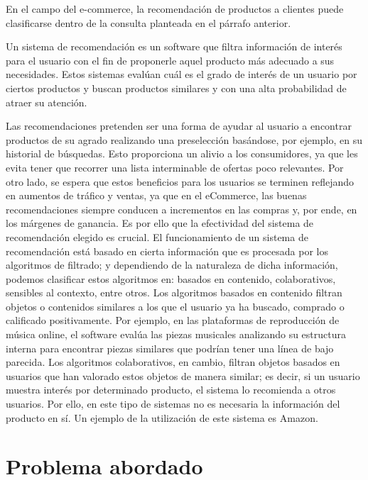En el campo del e-commerce, la recomendaci\'on de productos a clientes puede clasificarse dentro de la consulta planteada en el p\'arrafo anterior.

Un sistema de recomendaci\'on es un software que filtra informaci\'on de inter\'es para el usuario con el fin de proponerle aquel producto m\'as adecuado a sus necesidades. Estos sistemas eval\'uan cu\'al es el grado de inter\'es de un usuario por ciertos productos y buscan productos similares y con una alta probabilidad de atraer su atenci\'on.

Las recomendaciones pretenden ser una forma de ayudar al usuario a encontrar productos de su agrado realizando una preselecci\'on bas\'andose, por ejemplo, en su historial de b\'usquedas. Esto proporciona un alivio a los consumidores, ya que les evita tener que recorrer una lista interminable de ofertas poco relevantes. Por otro lado, se espera que estos beneficios para los usuarios se terminen reflejando en aumentos de tr\'afico y ventas, ya que en el eCommerce, las buenas recomendaciones siempre conducen a incrementos en las compras y, por ende, en los m\'argenes de ganancia. Es por ello que la efectividad del sistema de recomendaci\'on elegido es crucial.
El funcionamiento de un sistema de recomendaci\'on est\'a basado en cierta informaci\'on que es procesada por los algoritmos de filtrado; y dependiendo de la naturaleza de dicha informaci\'on, podemos clasificar estos algoritmos en: basados en contenido, colaborativos, sensibles al contexto, entre otros.
Los algoritmos basados en contenido filtran objetos o contenidos similares a los que el usuario ya ha buscado, comprado o calificado positivamente. Por ejemplo, en las plataformas de reproducci\'on de m\'usica online, el software eval\'ua las piezas musicales analizando su estructura interna para encontrar piezas similares que podr\'ian tener una l\'inea de bajo parecida.
Los algoritmos colaborativos, en cambio, filtran objetos basados en usuarios que han valorado estos objetos de manera similar; es decir, si un usuario muestra inter\'es por determinado producto, el sistema lo recomienda a otros usuarios. Por ello, en este tipo de sistemas no es necesaria la informaci\'on del producto en s\'i. Un ejemplo de la utilizaci\'on de este sistema es Amazon.

\section{Problema abordado}

